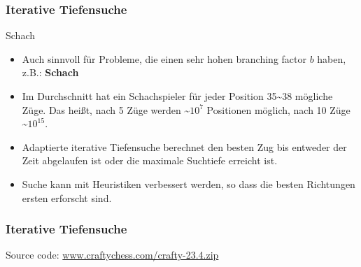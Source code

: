 \begin{frame}
	\frametitle{Iterative Tiefensuche}
	\begin{KITexampleblock}{Schach}
		\begin{itemize}
			\item Auch sinnvoll für Probleme, die einen sehr hohen branching factor $b$ haben, z.B.: \textbf{Schach}
			\item Im Durchschnitt hat ein Schachspieler für jeder Position 35\textasciitilde38 mögliche Züge. Das heißt, nach 5 Züge werden \textasciitilde$10^7$ Positionen möglich, nach 10 Züge \textasciitilde$10^{15}$.
			\item Adaptierte iterative Tiefensuche berechnet den besten Zug bis entweder der Zeit abgelaufen ist oder die maximale Suchtiefe erreicht ist.
			\item Suche kann mit Heuristiken verbessert werden, so dass die besten Richtungen ersten erforscht sind.
		\end{itemize}
	\end{KITexampleblock}
\end{frame}


\begin{frame}
	\frametitle{Iterative Tiefensuche}
	\Large Source code: \href{www.craftychess.com/crafty-23.4.zip}{www.craftychess.com/crafty-23.4.zip}
\end{frame}